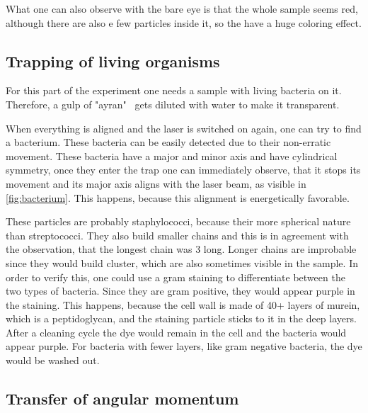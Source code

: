 \documentclass[12pt,english,ngerman]{scrartcl}
\begin{document}

What one can also observe with the bare eye is that the whole sample seems red,
although there are also e few particles inside it, so the have a huge coloring
effect.

\subsection{Trapping of living organisms}

For this part of the experiment one needs a sample with living bacteria on it.
Therefore, a gulp of "ayran" \ gets diluted with water to make it transparent.

When everything is aligned and the laser is switched on again, one can try to
find a bacterium. These bacteria can be easily detected due to their
non-erratic movement. These bacteria have a major and minor axis and have
cylindrical symmetry, once they enter the trap one can immediately observe,
that it stops its movement and its major axis aligns with the laser beam, as
visible in \autoref{fig:bacterium}. This happens, because this alignment is
energetically favorable.

These particles are probably staphylococci, because their more spherical nature
than streptococci. They also build smaller chains and this is in agreement with
the observation, that the longest chain was 3 long. Longer chains are
improbable since they would build cluster, which are also sometimes visible in
the sample. In order to verify this, one could use a gram staining to
differentiate between the two types of bacteria. Since they are gram positive,
they would appear purple in the staining. This happens, because the cell wall
is made of 40+ layers of murein, which is a peptidoglycan, and the staining
particle sticks to it in the deep layers. After a cleaning cycle the dye would
remain in the cell and the bacteria would appear purple. For bacteria with
fewer layers, like gram negative bacteria, the dye would be washed
out.\cite{ghazalMicrobiologicalHygenicDiscussion2024}

\subsection{Transfer of angular momentum}\label{sec:AuswertungAngularMomentum}
\end{document}
